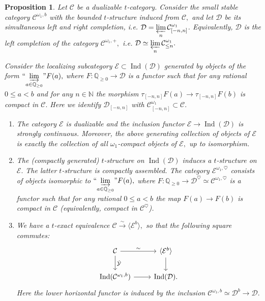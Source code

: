 \documentclass[11pt,leqno]{amsart}
\newtheorem{prop}[theo]{Proposition}
\numberwithin{equation}{section}
\def\N{\mathbb{N}}
\def\Q{\mathbb{Q}}
\newcommand{\indlim}[1][]{\mathop{\varinjlim}\limits_{#1}}
\newcommand{\inddlim}[1][]{{``{\indlim[#1]}"}}
\newcommand{\prolim}[1][]{\mathop{\varprojlim}\limits_{#1}}
\newcommand{\xto}{\xrightarrow}
\newcommand{\cD}{{\mathcal D}}
\newcommand{\cC}{{\mathcal C}}
\newcommand{\cE}{{\mathcal E}}
\newcommand{\cY}{{\mathcal Y}}
\newcommand{\la}{\langle}
\newcommand{\ra}{\rangle}
\newcommand{\Ind}{\operatorname{Ind}}
\begin{document}
\begin{prop}\label{prop:left_right_completion_dualizable}
Let $\cC$ be a dualizable $t$-category. Consider the small stable category $\cC^{\omega_1,b}$ with the bounded $t$-structure induced from $\cC,$ and let $\cD$ be its simultaneous left and right completion, i.e. $\cD=\prolim[n]\cC^{\omega_1}_{[-n,n]}$. Equivalently, $\cD$ is the left completion of the category $\cC^{\omega_1,+},$ i.e. $\cD\simeq\prolim[n]\cC^{\omega_1}_{\leq n}.$ 

Consider the localizing subcategory $\cE\subset\Ind(\cD)$ generated by objects of the form $\inddlim[a\in\Q_{\geq 0}]F(a),$ where $F:\Q_{\geq 0}\to \cD$ is a functor such that for any rational $0\leq a<b$ and for any $n\in\N$ the morphism $\tau_{[-n,n]}F(a)\to \tau_{[-n,n]}F(b)$ is compact in $\cC.$ Here we identify $\cD_{[-n,n]}$ with $\cC^{\omega_1}_{[-n,n]}\subset\cC.$

\begin{enumerate}[label=(\roman*),ref=(\roman*)]
	\item The category $\cE$ is dualizable and the inclusion functor $\cE\to\Ind(\cD)$ is strongly continuous. Moreover, the above generating collection of objects of $\cE$ is exactly the collection of all $\omega_1$-compact objects of $\cE,$ up to isomorphism. \label{E_is_dualizable_etc}
	\item The (compactly generated) $t$-structure on $\Ind(\cD)$ induces a $t$-structure on $\cE.$ The latter $t$-structure is compactly assembled. The category $\cE^{\omega_1,\heartsuit}$ consists of objects isomorphic to $\inddlim[a\in\Q_{\geq 0}]F(a),$ where $F:\Q_{\geq 0}\to\cD^{\heartsuit}\simeq\cC^{\omega_1,\heartsuit}$ is a functor such that for any rational $0\leq a<b$ the map $F(a)\to F(b)$ is compact in $\cC$ (equivalently, compact in $\cC^{\heartsuit}$). \label{t_structure_on_E}
	\item We have a $t$-exact equivalence $\cC\xto{\sim}\la \cE^b\ra,$ so that the following square commutes:
	\begin{equation*}
	\begin{tikzcd}
	\cC \ar[r, "\sim"]\ar{d}{\hat{\cY}} & \la \cE^b\ra\ar[d]\\
	\Ind(\cC^{\omega_1,b})\ar[r] & \Ind(\cD).
	\end{tikzcd}
	\end{equation*}
	Here the lower horizontal functor is induced by the inclusion $\cC^{\omega_1,b}\simeq \cD^b\to \cD.$ \label{E^b}
\end{enumerate}
\end{prop} 
\end{document}
